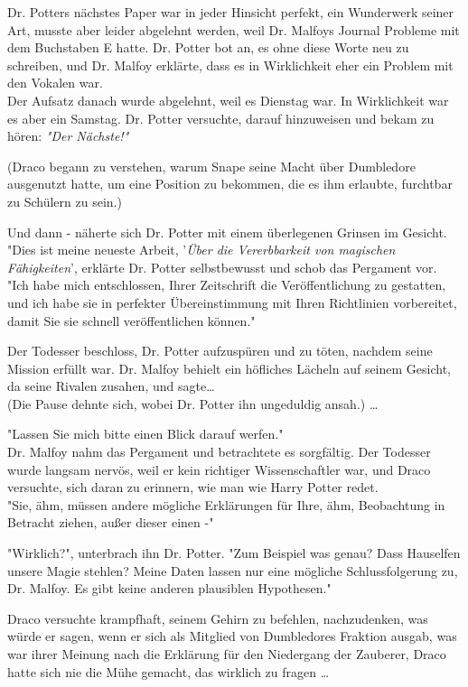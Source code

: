 {Dr. Potters nächstes Paper war in jeder Hinsicht perfekt, ein Wunderwerk seiner Art, musste aber leider abgelehnt werden, weil Dr. Malfoys Journal Probleme mit dem Buchstaben E hatte. Dr. Potter bot an, es ohne diese Worte neu zu schreiben, und Dr. Malfoy erklärte, dass es in Wirklichkeit eher ein Problem mit den Vokalen war.\\ Der Aufsatz danach wurde abgelehnt, weil es Dienstag war. In Wirklichkeit war es aber ein Samstag. Dr. Potter versuchte, darauf hinzuweisen und bekam zu hören: \emph{"Der Nächste!"}

(Draco begann zu verstehen, warum Snape seine Macht über Dumbledore ausgenutzt hatte, um eine Position zu bekommen, die es ihm erlaubte, furchtbar zu Schülern zu sein.)

Und dann - näherte sich Dr. Potter mit einem überlegenen Grinsen im Gesicht.\\ "Dies ist meine neueste Arbeit, '\emph{Über die Vererbbarkeit von magischen Fähigkeiten}', erklärte Dr. Potter selbstbewusst und schob das Pergament vor.\\ "Ich habe mich entschlossen, Ihrer Zeitschrift die Veröffentlichung zu gestatten, und ich habe sie in perfekter Übereinstimmung mit Ihren Richtlinien vorbereitet, damit Sie sie schnell veröffentlichen können."

Der Todesser beschloss, Dr. Potter aufzuspüren und zu töten, nachdem seine Mission erfüllt war. Dr. Malfoy behielt ein höfliches Lächeln auf seinem Gesicht, da seine Rivalen zusahen, und sagte…\\ (Die Pause dehnte sich, wobei Dr. Potter ihn ungeduldig ansah.) …

"Lassen Sie mich bitte einen Blick darauf werfen."\\ Dr. Malfoy nahm das Pergament und betrachtete es sorgfältig. Der Todesser wurde langsam nervös, weil er kein richtiger Wissenschaftler war, und Draco versuchte, sich daran zu erinnern, wie man wie Harry Potter redet.\\ "Sie, ähm, müssen andere mögliche Erklärungen für Ihre, ähm, Beobachtung in Betracht ziehen, außer dieser einen -"

"Wirklich?", unterbrach ihn Dr. Potter. "Zum Beispiel was genau? Dass Hauselfen unsere Magie stehlen? Meine Daten lassen nur eine mögliche Schlussfolgerung zu, Dr. Malfoy. Es gibt keine anderen plausiblen Hypothesen."

Draco versuchte krampfhaft, seinem Gehirn zu befehlen, nachzudenken, was würde er sagen, wenn er sich als Mitglied von Dumbledores Fraktion ausgab, was war ihrer Meinung nach die Erklärung für den Niedergang der Zauberer, Draco hatte sich nie die Mühe gemacht, das wirklich zu fragen …

}
